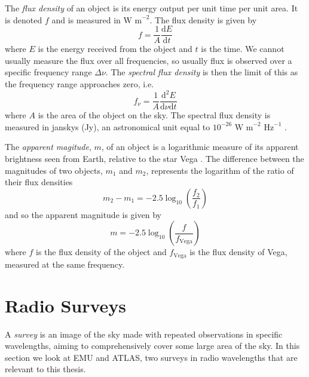             The \emph{flux density} of an object is its energy output per unit
            time per unit area. It is denoted $f$ and is measured in $\text{W
            m}^{-2}$. The flux density is given by
            \[
                f = \frac{1}{A}\frac{\text{d}E}{\text{d}t}
            \]
            where $E$ is the energy received from the object and $t$ is the
            time. We cannot usually measure the flux over all frequencies, so
            usually flux is observed over a specific frequency range $\Delta
            \nu$. The
            \emph{spectral flux density} is then the limit of this as the
            frequency range approaches zero, i.e.
            \[
                f_\nu = \frac{1}{A}\frac{\text{d}^2E}{\text{d}\nu\text{d}t}
            \]
            where $A$ is the area of the object on the sky. The spectral flux
            density is measured in janskys (Jy), an astronomical unit equal to
            $10^{-26} \text{ W m}^{-2} \text{ Hz}^{-1}$ \citep{francis08}.

            The \emph{apparent magitude}, $m$, of an object is a logarithmic
            measure of its apparent brightness seen from Earth, relative to the
            star Vega \citep{francis08}. The difference between the magnitudes
            of two objects, $m_1$ and $m_2$, represents the logarithm of the
            ratio of their flux densities
            \begin{equation}
                \label{eq:magnitude-difference}
                m_2 - m_1 = -2.5 \log_{10} \left(\frac{f_2}{f_1}\right)
            \end{equation}
            and so the apparent magnitude is given by
            \begin{equation}
                \label{eq:apparent-magnitude}
                m = -2.5 \log_{10} \left(\frac{f}{f_{\text{Vega}}}\right)
            \end{equation}
            where $f$ is the flux density of the object and $f_{\text{Vega}}$ is
            the flux density of Vega, measured at the same frequency.

    \section{Radio Surveys}
    \label{sec:radio-surveys}

        A \emph{survey} is an image of the sky made with repeated observations
        in specific wavelengths, aiming to comprehensively cover some large area
        of the sky. In this section we look at EMU and ATLAS, two surveys in
        radio wavelengths that are relevant to this thesis.

